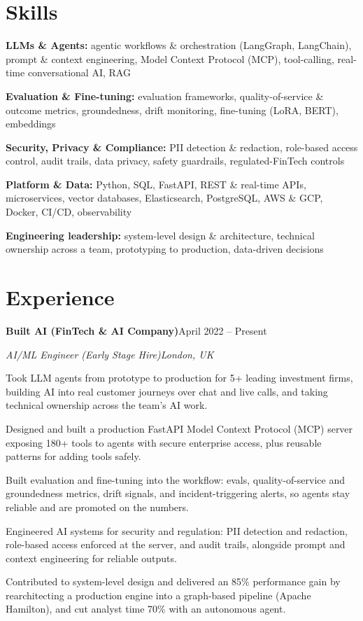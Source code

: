 \documentclass[10pt,a4paper]{article}
\newcommand{\entry}[4]{%
  {\color{company}\bfseries #1}\hfill {\color{muted}#2}\par
  \vspace{1pt}
  {\itshape #3}\hfill {\color{muted}\itshape #4}\par
  \vspace{3pt}%
}
\begin{document}
\section{Skills}
\begin{tight}
  \item[\textcolor{accent}{\small$\bullet$}] \textbf{LLMs \& Agents:} agentic workflows \& orchestration (LangGraph, LangChain), prompt \& context engineering, Model Context Protocol (MCP), tool-calling, real-time conversational AI, RAG
  \item[\textcolor{accent}{\small$\bullet$}] \textbf{Evaluation \& Fine-tuning:} evaluation frameworks, quality-of-service \& outcome metrics, groundedness, drift monitoring, fine-tuning (LoRA, BERT), embeddings
  \item[\textcolor{accent}{\small$\bullet$}] \textbf{Security, Privacy \& Compliance:} PII detection \& redaction, role-based access control, audit trails, data privacy, safety guardrails, regulated-FinTech controls
  \item[\textcolor{accent}{\small$\bullet$}] \textbf{Platform \& Data:} Python, SQL, FastAPI, REST \& real-time APIs, microservices, vector databases, Elasticsearch, PostgreSQL, AWS \& GCP, Docker, CI/CD, observability
  \item[\textcolor{accent}{\small$\bullet$}] \textbf{Engineering leadership:} system-level design \& architecture, technical ownership across a team, prototyping to production, data-driven decisions
\end{tight}

\section{Experience}
\entry{Built AI (FinTech \& AI Company)}{April 2022 -- Present}{AI/ML Engineer (Early Stage Hire)}{London, UK}
\begin{tight}
  \item Took LLM agents from prototype to production for 5+ leading investment firms, building AI into real customer journeys over chat and live calls, and taking technical ownership across the team's AI work.
  \item Designed and built a production FastAPI Model Context Protocol (MCP) server exposing 180+ tools to agents with secure enterprise access, plus reusable patterns for adding tools safely.
  \item Built evaluation and fine-tuning into the workflow: evals, quality-of-service and groundedness metrics, drift signals, and incident-triggering alerts, so agents stay reliable and are promoted on the numbers.
  \item Engineered AI systems for security and regulation: PII detection and redaction, role-based access enforced at the server, and audit trails, alongside prompt and context engineering for reliable outputs.
  \item Contributed to system-level design and delivered an 85\% performance gain by rearchitecting a production engine into a graph-based pipeline (Apache Hamilton), and cut analyst time 70\% with an autonomous agent.
\end{tight}
\end{document}
